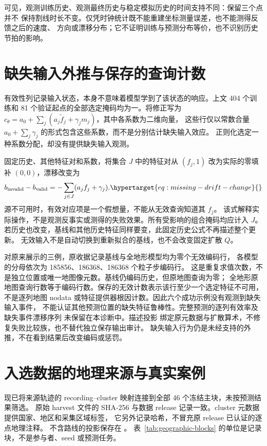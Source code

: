 可见，观测训练历史、观测最终历史与稳定模拟历史的时间支持不同：保留三个点并不
保持割线时长不变。仅凭时钟统计既不能重建坐标测量误差，也不能测得反馈之后的速度、
方向或漂移分布；它不证明训练与预测分布等价，也不识别历史节拍的影响。


\section{缺失输入外推与保存的查询计数}
\label{sec:missing-input-scope}\hypertarget{sec:missing-input-scope}{}
有效性列记录输入状态，本身不意味着模型学到了该状态的响应。上文 404 个训练和
81 个验证起点的全部选定掩码均为一。将修正写为
\(c_\theta=a_0+\sum_j(a_j\widetilde f_j+\gamma_jm_j)\)，其中各系数为二维向量，
这些行仅以常数合量 \(a_0+\sum_j\gamma_j\) 的形式包含这些系数，而不是分别估计缺失输入效应。
正则化选定一种系数分配，却没有提供缺失输入观测。

固定历史、其他特征对和系数，将集合 \(J\) 中的特征对从 \((f_j,1)\)
改为实际的零填补 \((0,0)\)，漂移改变为
\begin{equation}
b_{\rm invalid}-b_{\rm valid}=-\sum_{j\in J}(a_jf_j+\gamma_j).
\label{eq:missing-drift-change}\hypertarget{eq:missing-drift-change}{}
\end{equation}
源不可用时，有效对应项是一个假想量，不能从无效查询知道其 \(f_j\)。
该式解释实际操作，不是观测反事实或测得的失败效果。所有受影响的组合掩码均应计入 \(J\)。
若历史也改变，基线和其他历史特征同样要变，此固定历史公式不再描述整个更新。
无效输入不是自动切换到重新拟合的基线，也不会改变固定扩散 \(Q\)。

对原来展示的三例，原收据记录基线与全地形模型均为零个无效编码行，
各模型的分母依次为 185856、186368、186368 个粒子步编码行。
这是重复求值次数，不是独立位置或唯一地图像元数。基线仍编码历史，但原地图查询为零；
全地形原地图查询行数等于编码行数。保存的无效计数表示该行至少一个选定特征不可用，
不是逐列地图 nodata 或特征提供器根因计数。因此六个成功示例没有观测到缺失输入事件，
不能认证其他预测位置的缺失特征鲁棒性。完整预测的逐列有效率及缺失事件漂移序列
未保留在本诊断中。描述投影
绑定原元数据与扩散算术，不修复失败比较族，也不替代独立保存输出审计。
缺失输入行为仍是未经支持的外推，不在看到结果后改变编码或惩罚。


\section{入选数据的地理来源与真实案例}
现已将来源轨迹的 recording--cluster 映射连接到全部 46 个冻结主块，未按预测结果筛选。
原始 harvest 文件的 SHA-256 与数据 release 记录一致。cluster 元数据提供国家、地区和采集区域标签，
它另外记录哈希，不冒充原 release 已认证的逐点地理注释。
不含路线的投影保存在 。
表~\ref{tab:geographic-blocks} 的单位是记录块，不是参与者、seed 或预测任务。

